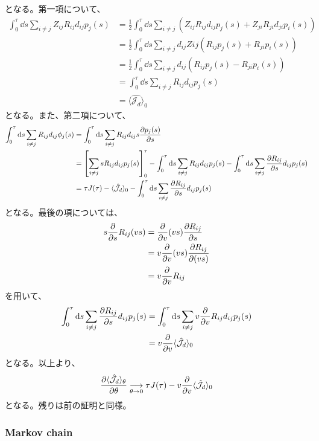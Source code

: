 \documentclass[a4paper,11pt]{jsarticle}
\numberwithin{equation}{section}
\begin{document}
となる。第一項について、
\begin{align}
    \int_0^\tau \dd{s} \sum_{i \neq j} Z_{ij}R_{ij}d_{ij}p_j(s) 
    &= \frac{1}{2} \int_0^\tau \dd{s} \sum_{i \neq j} (Z_{ij}R_{ij}d_{ij}p_j(s) + Z_{ji}R_{ji}d_{ji}p_i(s))\\
    &= \frac{1}{2} \int_0^\tau \dd{s} \sum_{i \neq j} d_{ij}Z{ij}(R_{ij}p_j(s) + R_{ji}p_i(s))\\
    &= \frac{1}{2} \int_0^\tau \dd{s} \sum_{i \neq j} d_{ij}(R_{ij}p_j(s) - R_{ji}p_i(s))\\
    &= \int_{0}^{\tau} \dd{s} \sum_{i \neq j} R_{ij}d_{ij}p_j(s)\\
    &= \langle \hat{\mathcal{J}_d} \rangle_0
\end{align}
となる。また、第二項について、
\begin{align}
    \int_0^\tau \dd{s} \sum_{i \neq j} R_{ij}d_{ij}\phi_j(s) 
    &= \int_0^\tau \dd{s} \sum_{i \neq j} R_{ij}d_{ij}s\pdv{p_j(s)}{s} \\
    &= \left[\sum_{i \neq j}sR_{ij}d_{ij}p_j(s)\right]_0^\tau - \int_{0}^{\tau} \dd{s} \sum_{i \neq j} R_{ij}d_{ij}p_j(s) - \int_{0}^{\tau} \dd{s} \sum_{i \neq j} \pdv{R_{ij}}{s}d_{ij}p_j(s)\\
    &= \tau J(\tau)- \langle \hat{\mathcal{J}_d} \rangle_0 - \int_{0}^{\tau} \dd{s} \sum_{i \neq j} \pdv{R_{ij}}{s}d_{ij}p_j(s)\\
\end{align}
となる。最後の項については、
\begin{align}
    s\pdv{s}R_{ij}(vs) &= \pdv{v}(vs)\pdv{R_{ij}}{s}\\
    &= v\pdv{v}(vs)\pdv{R_{ij}}{(vs)}\\
    &= v\pdv{v}R_{ij}
\end{align}
を用いて、
\begin{align}
    \int_{0}^{\tau} \dd{s} \sum_{i \neq j} \pdv{R_{ij}}{s}d_{ij}p_j(s) 
    &= \int_{0}^{\tau} \dd{s} \sum_{i \neq j} v\pdv{v}R_{ij}d_{ij}p_j(s)\\
    &= v\pdv{v}\langle \hat{\mathcal{J}_d} \rangle_0
\end{align}
となる。以上より、
\begin{align}
    \pdv{\langle \hat{\mathcal{J}_d} \rangle_\theta}{\theta} \underset{\theta \to 0}{\longrightarrow}  \tau J(\tau)- v\pdv{v}\langle \hat{\mathcal{J}_d} \rangle_0
\end{align}
となる。残りは前の証明と同様。\\


\subsubsection{Markov chain}
\end{document}
